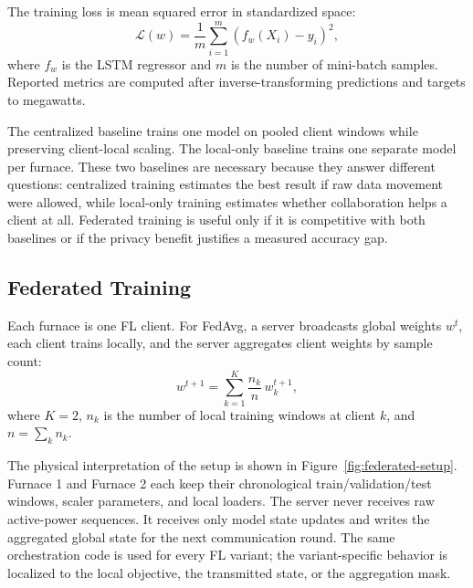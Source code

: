 \documentclass[pdflatex,sn-mathphys-num]{sn-jnl}
\theoremstyle{thmstyleone}%
\theoremstyle{thmstyletwo}%
\theoremstyle{thmstylethree}%
\begin{document}
The training loss is mean squared error in standardized space:
\begin{equation}
    \mathcal{L}(w) = \frac{1}{m}\sum_{i=1}^{m}\left(f_w(X_i)-y_i\right)^2 ,
    \label{eq:mse}
\end{equation}
where $f_w$ is the LSTM regressor and $m$ is the number of mini-batch samples. Reported metrics are computed after inverse-transforming predictions and targets to megawatts.

The centralized baseline trains one model on pooled client windows while preserving client-local scaling. The local-only baseline trains one separate model per furnace. These two baselines are necessary because they answer different questions: centralized training estimates the best result if raw data movement were allowed, while local-only training estimates whether collaboration helps a client at all. Federated training is useful only if it is competitive with both baselines or if the privacy benefit justifies a measured accuracy gap.

\subsection{Federated Training}\label{sec:fl-setup}

Each furnace is one FL client. For FedAvg, a server broadcasts global weights $w^t$, each client trains locally, and the server aggregates client weights by sample count:
\begin{equation}
    w^{t+1} = \sum_{k=1}^{K} \frac{n_k}{n}\, w_k^{t+1},
    \label{eq:fedavg}
\end{equation}
where $K=2$, $n_k$ is the number of local training windows at client $k$, and $n=\sum_k n_k$.

The physical interpretation of the setup is shown in Figure~\ref{fig:federated-setup}. Furnace 1 and Furnace 2 each keep their chronological train/validation/test windows, scaler parameters, and local loaders. The server never receives raw active-power sequences. It receives only model state updates and writes the aggregated global state for the next communication round. The same orchestration code is used for every FL variant; the variant-specific behavior is localized to the local objective, the transmitted state, or the aggregation mask.
\end{document}
